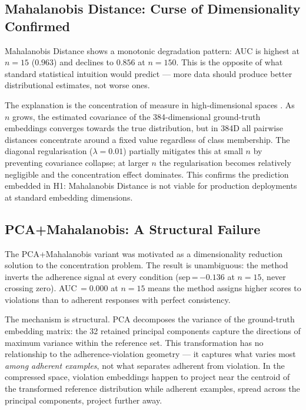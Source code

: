 \documentclass[11pt,a4paper]{article}
\begin{document}
\subsection{Mahalanobis Distance: Curse of Dimensionality Confirmed}

Mahalanobis Distance shows a monotonic degradation pattern: AUC is highest at
$n = 15$ ($0.963$) and declines to $0.856$ at $n = 150$. This is the opposite
of what standard statistical intuition would predict --- more data should
produce better distributional estimates, not worse ones.

The explanation is the concentration of measure in high-dimensional spaces
\citep{beyer1999nearest}. As $n$ grows, the estimated covariance of the
384-dimensional ground-truth embeddings converges towards the true distribution,
but in 384D all pairwise distances concentrate around a fixed value regardless
of class membership. The diagonal regularisation ($\lambda = 0.01$) partially
mitigates this at small $n$ by preventing covariance collapse; at larger $n$
the regularisation becomes relatively negligible and the concentration effect
dominates. This confirms the prediction embedded in H1: Mahalanobis Distance
is not viable for production deployments at standard embedding dimensions.

\subsection{PCA+Mahalanobis: A Structural Failure}

The PCA+Mahalanobis variant was motivated as a dimensionality reduction
solution to the concentration problem. The result is unambiguous: the method
inverts the adherence signal at every condition
(sep\,=\,$-0.136$ at $n = 15$, never crossing zero). AUC\,$= 0.000$ at
$n = 15$ means the method assigns higher scores to violations than to adherent
responses with perfect consistency.

The mechanism is structural. PCA decomposes the variance of the ground-truth
embedding matrix: the 32 retained principal components capture the directions
of maximum variance within the reference set. This transformation has no
relationship to the adherence-violation geometry --- it captures what varies
most \emph{among adherent examples}, not what separates adherent from violation.
In the compressed space, violation embeddings happen to project near the centroid
of the transformed reference distribution while adherent examples, spread across
the principal components, project further away.
\end{document}
